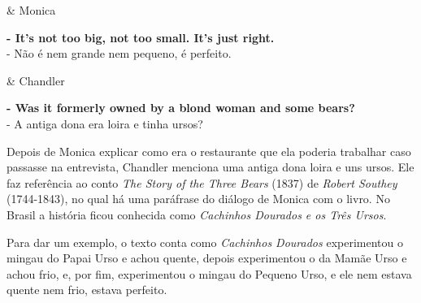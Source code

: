\begin{tcolorbox}[enhanced,center upper,
    drop fuzzy shadow southeast, boxrule=0.3pt,
    lower separated=false, breakable,
    colframe=black!30!dialogoBorder,colback=white]
\begin{minipage}[c]{0.16\linewidth}
   & \centering \scriptsize{Monica}
\end{minipage}
\hfill
\begin{minipage}[c]{0.8\linewidth}
  \textbf{- It's not too big, not too small. It's just right.}\\
  - Não é nem grande nem pequeno, é perfeito.
\end{minipage}

\medskip
\begin{minipage}[c]{0.16\linewidth}
   & \centering \scriptsize{Chandler}
\end{minipage}
\hfill
\begin{minipage}[c]{0.8\linewidth}
  \textbf{- Was it formerly owned by a blond woman and some bears?}\\
  - A antiga dona era loira e tinha ursos?
\end{minipage}
\end{tcolorbox}

Depois de Monica explicar como era o restaurante que ela poderia
trabalhar caso passasse na entrevista, Chandler menciona uma antiga dona
loira e uns ursos. Ele faz referência ao conto \emph{The Story of the
Three Bears} (1837) de \emph{Robert Southey} (1744-1843), no qual há uma
paráfrase do diálogo de Monica com o livro. No Brasil a história ficou
conhecida como \emph{Cachinhos Dourados e os Três Ursos}.

Para dar um exemplo, o texto conta como \emph{Cachinhos Dourados}
experimentou o mingau do Papai Urso e achou quente, depois experimentou
o da Mamãe Urso e achou frio, e, por fim, experimentou o mingau do
Pequeno Urso, e ele nem estava quente nem frio, estava perfeito.


